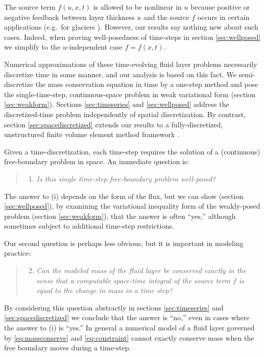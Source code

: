 \documentclass[final,leqno,onefignum,onetabnum]{siamltex1213bueler}
\begin{document}
The source term $f(u,x,t)$ is allowed to be nonlinear in $u$ because positive or negative feedback between layer thickness $u$ and the source $f$ occurs in certain applications (e.g.~for glaciers \cite{Jouvetetal2011}).  However, our results say nothing new about such cases.  Indeed, when proving well-posedness of time-steps in section \ref{sec:wellposed} we simplify to the $u$-independent case $f=f(x,t)$.

Numerical approximations of these time-evolving fluid layer problems necessarily discretize time in some manner, and our analysis is based on this fact.  We semi-discretize the mass conservation equation in time by a one-step method and pose the single-time-step, continuous-space problem in weak variational form  (section \ref{sec:weakform}).  Sections \ref{sec:timeseries} and \ref{sec:wellposed} address the discretized-time problem independently of spatial discretization.  By contrast, section \ref{sec:spacediscretized} extends our results to a fully-discretized, unstructured finite volume element method framework \cite{Cai1990}.

Given a time-discretization, each time-step requires the solution of a (continuous) free-boundary problem in space.  An immediate question is:
  \begin{quote}
  \renewcommand{\labelenumi}{(\roman{enumi})}
  \begin{enumerate}
  \item \emph{Is this single time-step free-boundary problem well-posed?}
  \end{enumerate}
  \end{quote}
The answer to (i) depends on the form of the flux, but we can show (section \ref{sec:wellposed}), by examining the variational inequality form of the weakly-posed problem (section \ref{sec:weakform}), that the answer is often ``yes,'' although sometimes subject to  additional time-step restrictions.

Our second question is perhaps less obvious, but it is important in modeling practice:
  \begin{quote}
  \renewcommand{\labelenumi}{(\roman{enumi})}
  \begin{enumerate}
  \setcounter{enumi}{1}
  \item \emph{Can the modeled mass of the fluid layer be conserved exactly in the sense that a computable space-time integral of the source term $f$ is equal to the change in mass in a time step?}
  \end{enumerate}
  \end{quote}
By considering this question abstractly in sections \ref{sec:timeseries} and \ref{sec:spacediscretized} we conclude that the answer is ``no,'' even in cases where the answer to (i) is ``yes.''  In general a numerical model of a fluid layer governed by \eqref{eq:massconserve} and \eqref{eq:constraint} cannot exactly conserve mass when the free boundary moves during a time-step.
\end{document}
